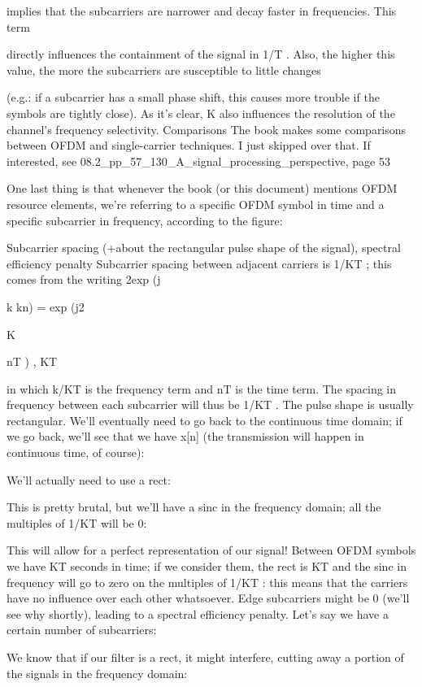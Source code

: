 {{{implies that the subcarriers are narrower and decay faster in frequencies. This term

directly influences the containment of the signal in 1/T .
Also, the higher this value, the more the subcarriers are susceptible to little changes

(e.g.: if a subcarrier has a small phase shift, this causes more trouble if the symbols are tightly close).
As it's clear, K also influences the resolution of the channel's frequency selectivity.
Comparisons The book makes some comparisons between OFDM and single-carrier techniques.
I just skipped over that.
If interested, see 08.2_pp_57_130_A_signal_processing_perspective, page 53

One last thing is that whenever the book (or this document) mentions OFDM resource elements, we're referring to a specific OFDM symbol in time and a specific subcarrier in frequency, according to the figure:

Subcarrier spacing (+about the rectangular pulse shape of the signal), spectral efficiency penalty Subcarrier spacing between adjacent carriers is 1/KT ; this comes from the writing 2\pi exp (j

k kn) = exp (j2\pi

K

nT ) ,
KT

in which k/KT is the frequency term and nT is the time term.
The spacing in frequency between each subcarrier will thus be 1/KT .
The pulse shape is usually rectangular. We'll eventually need to go back to the continuous time domain; if we go back, we'll see that we have x[n] (the transmission will happen in continuous time, of course):

We'll actually need to use a rect:

This is pretty brutal, but we'll have a sinc in the frequency domain; all the multiples of 1/KT will be 0:

This will allow for a perfect representation of our signal!
Between OFDM symbols we have KT seconds in time; if we consider them, the rect is KT and the sinc in frequency will go to zero on the multiples of 1/KT : this means that the carriers have no influence over each other whatsoever.
Edge subcarriers might be 0 (we'll see why shortly), leading to a spectral efficiency penalty.
Let's say we have a certain number of subcarriers:

We know that if our filter is a rect, it might interfere, cutting away a portion of the signals in the frequency domain:

}}}
